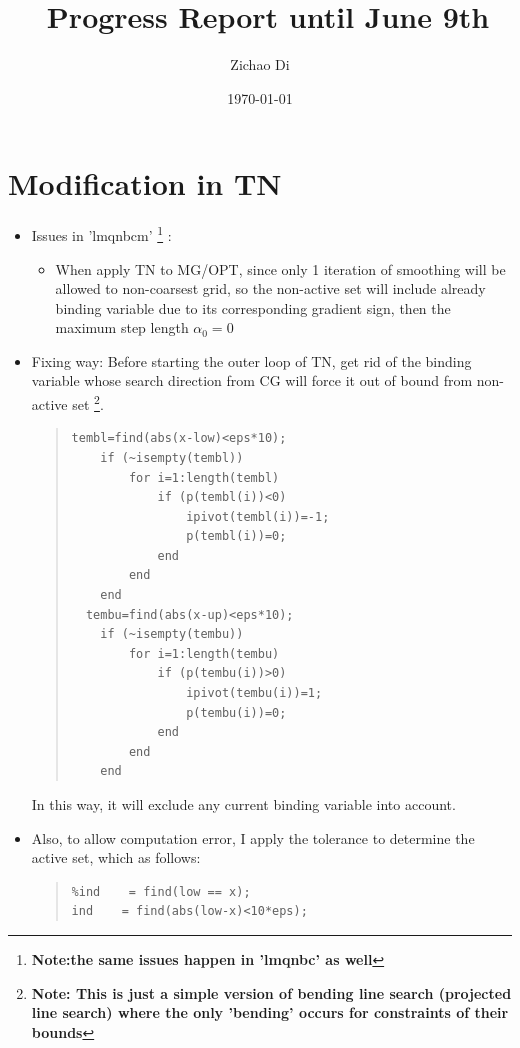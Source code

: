 \documentclass[10pt]{article}
\title{\ Progress Report until June 9th}
\author{Zichao Di}
\date{\today}
\begin{document}
  \maketitle 

\section {Modification in TN}
\begin{itemize}
\item Issues in 'lmqnbcm' \footnote{\bf Note:the same issues happen in 'lmqnbc' as well} : 
\begin{itemize}
\item When apply TN to MG/OPT, since only 1 iteration of smoothing will be allowed to non-coarsest grid,  so the non-active set will include already binding variable due to its corresponding gradient sign, then the maximum step length $\alpha_{0}=0$
\end{itemize}
\item Fixing way: Before starting the outer loop of TN, get rid of the binding variable whose search direction from CG will force it out of bound from non-active set \footnote{\bf Note: This is just a simple version of bending line search (projected line search) where the only 'bending' occurs for constraints of their bounds}.
\begin{quote}
\begin{verbatim}
tembl=find(abs(x-low)<eps*10);
    if (~isempty(tembl))
        for i=1:length(tembl)
            if (p(tembl(i))<0)
                ipivot(tembl(i))=-1;
                p(tembl(i))=0;
            end
        end
    end
  tembu=find(abs(x-up)<eps*10);
    if (~isempty(tembu))
        for i=1:length(tembu)
            if (p(tembu(i))>0)
                ipivot(tembu(i))=1;
                p(tembu(i))=0;
            end
        end
    end   
\end{verbatim}
\end{quote}
In this way, it will exclude any current binding variable into account.
\item Also, to allow computation error, I apply the tolerance to determine the active set, which as follows: 
\begin{quote}
\begin{verbatim}
%ind    = find(low == x);
ind    = find(abs(low-x)<10*eps);
\end{verbatim}
\end{quote}

\end {itemize}
\end{document}
